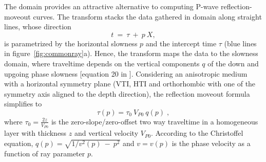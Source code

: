 
The \taup domain provides an attractive alternative to computing
P-wave reflection-moveout curves. The \taup transform stacks the data
gathered in \tx domain along straight lines, whose direction
\begin{equation}
t~=~\tau~+~p~X,  \label{eq:tauptransform}
\end{equation}
is parametrized by the horizontal slowness $p$ and the intercept time
$\tau$ (blue lines in figure~\ref{fig:commonray}a). Hence, the \taup
transform maps the data to the slowness domain, where traveltime
depends on the vertical components $q$ of the down and upgoing phase
slowness [equation 20 in \cite{baan:1076}]. Considering an anisotropic
medium with a horizontal symmetry plane (VTI, HTI and orthorhombic with
one of the symmetry axis aligned to the depth direction), the \taup
reflection moveout formula simplifies to
\begin{equation}
\tau (p)=\tau _{0}~V_{P0}~q(p)\;,  \label{eq:taupmoveout}
\end{equation}
where $\tau _{0}=\frac{2z}{V_{P0}}$ is the zero-slope/zero-offset two
way traveltime in a homogeneous layer with thickness $z$ and vertical
velocity $V_{P0}$. According to the Christoffel equation,
$q(p)=\sqrt{1/v^{2}(p)~-~p^{2}}$ and $v=v(p)$ is the phase velocity as
a function of  ray parameter $p$.


